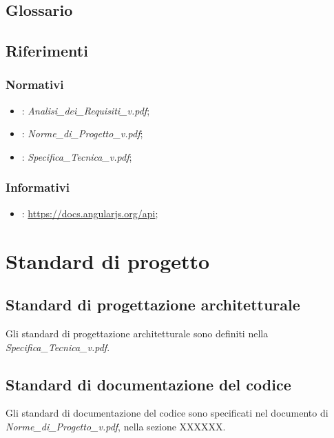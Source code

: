 \subsection{Glossario}
\Glossario{}

\subsection{Riferimenti}

\subsubsection{Normativi}
\begin{itemize}
\item {}: \emph{Analisi\_{}dei\_{}Requisiti\_{}v\versioneAnalisiDeiRequisiti{}.pdf};
\item {}: \emph{Norme\_{}di\_{}Progetto\_{}v\versioneNormeDiProgetto{}.pdf};
\item {}: \emph{Specifica\_{}Tecnica\_{}v\versioneNormeDiProgetto{}.pdf};
\end{itemize}

\subsubsection{Informativi}
\begin{itemize}
\item {}: \url{https://docs.angularjs.org/api};
\end{itemize}

\newpage
\section{Standard di progetto}
\subsection{Standard di progettazione architetturale}
Gli standard di progettazione architetturale sono definiti nella \emph{Specifica\_{}Tecnica\_{}v\versioneSpecificaTecnica{}.pdf}.

\subsection{Standard di documentazione del codice}
Gli standard di documentazione del codice sono specificati nel documento di 
\emph{Norme\_{}di\_{}Progetto\_{}v\versioneNormeDiProgetto{}.pdf}, nella sezione XXXXXX.	%

